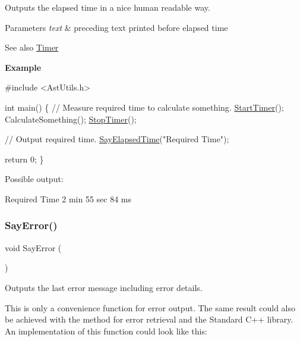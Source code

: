 Outputs the elapsed time in a nice human readable way.


\begin{DoxyParams}{Parameters}
{\em text} & preceding text printed before elapsed time\\
\hline
\end{DoxyParams}
\begin{DoxySeeAlso}{See also}
\hyperlink{group__timer__group}{Timer}
\end{DoxySeeAlso}
{\bfseries Example} 
\begin{DoxyCode}
\textcolor{preprocessor}{#include <AstUtils.h>}

\textcolor{keywordtype}{int} main()
\{
  \textcolor{comment}{// Measure required time to calculate something.}
  \hyperlink{group__timer__group_ga66509b494102a5c28ba6c8be3eab7733}{StartTimer}();
  CalculateSomething();
  \hyperlink{group__timer__group_gaf3619f34a9bc0184b4578e5337069856}{StopTimer}();

  \textcolor{comment}{// Output required time.}
  \hyperlink{group__io__group_ga9988545ab3fddd93e05654323cdb1f4b}{SayElapsedTime}(\textcolor{stringliteral}{"Required Time"});

  \textcolor{keywordflow}{return} 0;
\}
\end{DoxyCode}
 Possible output\+: 
\begin{DoxyCode}
Required Time 2 min 55 sec 84 ms
\end{DoxyCode}
 \mbox{\label{group__io__group_gaa8fd8044fbf35d58e73087b6399cd82a}} 
\subsubsection{\texorpdfstring{Say\+Error()}{SayError()}}
{\footnotesize\ttfamily void Say\+Error (\begin{DoxyParamCaption}{ }\end{DoxyParamCaption})}

Outputs the last error message including error details.

This is only a convenience function for error output. The same result could also be achieved with the method for error retrieval and the Standard C++ library. An implementation of this function could look like this\+:


